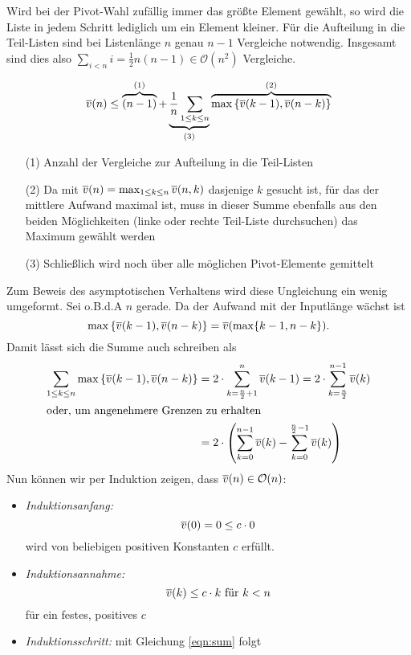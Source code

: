 \begin{flushenum}
\item
  Wird bei der Pivot-Wahl zufällig immer das größte Element gewählt, so wird
  die Liste in jedem Schritt lediglich um ein Element kleiner. Für die
  Aufteilung in die Teil-Listen sind bei Listenlänge $n$ genau $n-1$ Vergleiche
  notwendig. Insgesamt sind dies also $\sum_{i<n}i = \frac{1}{2}n(n-1) \in
  \mathcal{O}(n^2)$ Vergleiche.
\item
\[ \overline{v}(n) \leq \overbrace{(n-1)}^{(1)} +
\underbrace{\frac{1}{n}\sum_{1\leq k \leq n}}_{(3)}
\overbrace{\max\left\{\overline{v}(k-1),\overline{v}(n-k)\right\}}^{(2)} \]
\begin{itemize}
	\item[(1)] Anzahl der Vergleiche zur Aufteilung in die Teil-Listen
	\item[(2)] Da mit $\overline{v}(n) =
		\max_{1\leq k\leq n}\overline{v}(n,k)$ dasjenige $k$ gesucht ist, für das
		der mittlere Aufwand maximal ist, muss in dieser Summe
		ebenfalls aus den beiden Möglichkeiten (linke oder rechte
		Teil-Liste durchsuchen) das Maximum gewählt werden
	\item[(3)] Schließlich wird noch über alle möglichen Pivot-Elemente gemittelt
\end{itemize}
Zum Beweis des asymptotischen Verhaltens wird diese Ungleichung ein wenig
umgeformt. Sei o.B.d.A $n$ gerade. Da der Aufwand mit der Inputlänge
wächst ist
\[ \max\left\{\overline{v}(k-1), \overline{v}(n-k)\right\} =
\overline{v}(\max\{k-1,n-k\}). \]
Damit lässt sich die Summe auch schreiben als
\begin{align} \nonumber \sum_{1\leq k\leq n} \max\left\{\overline{v}(k-1),\overline{v}(n-k)\right\}
&= 2 \cdot \sum_{k=\frac{n}{2}+1}^n \overline{v}(k-1) = 2 \cdot \sum_{k=\frac{n}{2}}^{n-1} \overline{v}(k) \\
\intertext{oder, um angenehmere Grenzen zu erhalten}
&= 2 \cdot \left(\sum_{k=0}^{n-1} \overline{v}(k) - \sum_{k=0}^{\frac{n}{2}-1} \overline{v}(k)\right) \label{eqn:sum}
\end{align}
Nun können wir per Induktion zeigen, dass $\overline{v}(n) \in \mathcal{O}(n)$:
\begin{itemize}
	\item \textit{Induktionsanfang:} \[ \overline{v}(0) = 0 \leq c \cdot 0 \]
		wird von beliebigen positiven Konstanten $c$ erfüllt.
	\item \textit{Induktionsannahme:} \[ \overline{v}(k) \leq c \cdot k \text{ für } k < n \]
		für ein festes, positives $c$
	\item \textit{Induktionsschritt:} mit Gleichung \eqref{eqn:sum} folgt

\end{itemize}
\end{flushenum}
